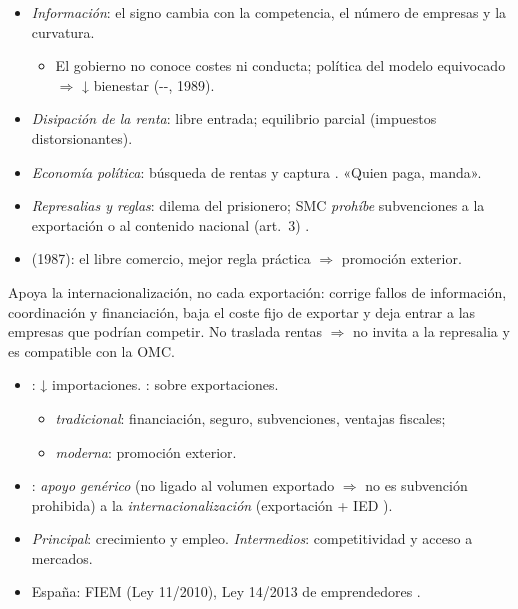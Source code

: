 \documentclass{article}
\begin{document}
\begin{columnas}
\begin{itemize}
\item \emph{Información}: el signo cambia con la competencia, el número de empresas y la curvatura.
  \begin{itemize}
  \item El gobierno no conoce costes ni conducta; política del modelo equivocado $\Rightarrow$ ↓ bienestar (--, 1989).
  \end{itemize}
\item \emph{Disipación de la renta}: libre entrada; equilibrio parcial (impuestos distorsionantes).
\item \emph{Economía política}: búsqueda de rentas y captura . «Quien paga, manda».
\item \emph{Represalias y reglas}: dilema del prisionero; SMC \emph{prohíbe} subvenciones a la exportación o al contenido nacional (art.~3) .
\item {} (1987): el libre comercio, mejor regla práctica $\Rightarrow$ promoción exterior.
\end{itemize}

\begin{ideaclave}
Apoya la internacionalización, no cada exportación: corrige fallos de información, coordinación y financiación, baja el coste fijo de exportar y deja entrar a las empresas que podrían competir. No traslada rentas $\Rightarrow$ no invita a la represalia y es compatible con la OMC.
\end{ideaclave}

\begin{itemize}
\item {}: ↓ importaciones. : sobre exportaciones.
  \begin{itemize}
  \item \emph{tradicional}: financiación, seguro, subvenciones, ventajas fiscales;
  \item \emph{moderna}: promoción exterior.
  \end{itemize}
\item {}: \emph{apoyo genérico} (no ligado al volumen exportado $\Rightarrow$ no es subvención prohibida) a la \emph{internacionalización} (exportación + IED ).
\item \emph{Principal}: crecimiento y empleo. \emph{Intermedios}: competitividad y acceso a mercados.
\item España: FIEM (Ley 11/2010), Ley 14/2013 de emprendedores .
\end{itemize}


\end{columnas}
\end{document}
